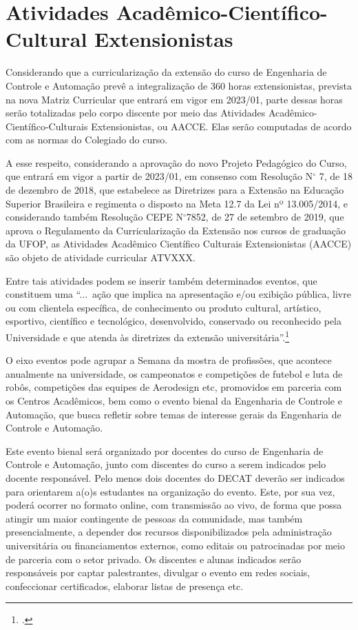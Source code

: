 \documentclass[
	12pt,				%
	openright,			%
	oneside,			%
	a4paper,			%
	english,			%
	brazil				%
	]{abntex2}
\begin{document}
\section{Atividades Acadêmico-Científico-Cultural Extensionistas}

Considerando que a curricularização da extensão do curso de Engenharia de Controle e Automação prevê a integralização de 360 horas extensionistas, prevista na nova Matriz Curricular que entrará em vigor em 2023/01, parte dessas horas serão totalizadas pelo corpo discente por meio das Atividades Acadêmico-Científico-Culturais Extensionistas, ou AACCE. Elas serão computadas de acordo com as normas do Colegiado do curso.

A esse respeito, considerando a aprovação do novo Projeto Pedagógico do Curso, que entrará em vigor a partir de 2023/01, em consenso com Resolução N$^\circ$ 7, de 18 de dezembro de 2018, que estabelece as Diretrizes para a Extensão na Educação Superior Brasileira e regimenta o disposto na Meta 12.7 da Lei nº 13.005/2014, e considerando também Resolução CEPE N$^\circ$7852, de 27 de setembro de 2019, que aprova o Regulamento da Curricularização da Extensão nos cursos de graduação da UFOP, as Atividades Acadêmico Científico Culturais Extensionistas (AACCE) são objeto de atividade curricular ATVXXX.

Entre tais atividades podem se inserir também determinados eventos, que constituem uma ``...~ação que implica na apresentação e/ou exibição pública, livre ou com clientela específica, de conhecimento ou produto cultural, artístico, esportivo, científico e tecnológico, desenvolvido, conservado ou reconhecido pela Universidade e que atenda às diretrizes da extensão universitária''.\footcite{manual-ppc-ufop}

O eixo eventos pode agrupar a Semana da mostra de profissões, que acontece anualmente na universidade, os campeonatos e competições de futebol e luta de robôs, competições das equipes de Aerodesign etc, promovidos em parceria com os Centros Acadêmicos, bem como o evento bienal da Engenharia de Controle e Automação, que busca refletir sobre temas de interesse gerais da Engenharia de Controle e Automação.

Este evento bienal será organizado por docentes do curso de Engenharia de Controle e Automação, junto com discentes do curso a serem indicados pelo docente responsável. Pelo menos dois docentes do DECAT deverão ser indicados para orientarem a(o)s estudantes na organização do evento. Este, por sua vez, poderá ocorrer no formato online, com transmissão ao vivo, de forma que possa atingir um  maior contingente de pessoas da comunidade, mas também presencialmente, a depender dos recursos disponibilizados pela administração universitária ou financiamentos externos, como editais ou patrocinadas por meio de parceria com o setor privado. Os discentes e alunas indicados serão responsáveis por captar palestrantes, divulgar o evento em redes sociais, confeccionar certificados, elaborar listas de presença etc.
\end{document}
